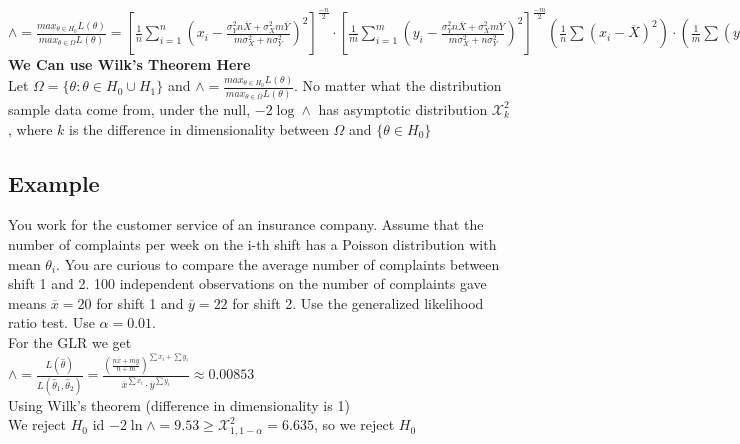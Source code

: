 \documentclass{article}
\begin{document}
\newline
$\wedge = \frac{max_{\theta\in H_0}L(\theta)}{max_{\theta\in\Omega}L(\theta)}=[\frac{1}{n}\sum_{i=1}^n(x_i-\frac{\sigma_Y^2n\overline{X}+\sigma_X^2m\overline{Y}}{m\sigma_X^2+n\sigma_Y^2})^2]^\frac{-n}{2}\cdot[\frac{1}{m}\sum_{i=1}^m(y_i-\frac{\sigma_Y^2n\overline{X}+\sigma_X^2m\overline{Y}}{m\sigma_X^2+n\sigma_Y^2})^2]^\frac{-m}{2}(\frac{1}{n}\sum(x_i-\overline{X})^2)\cdot(\frac{1}{m}\sum(y_i-\overline{Y})^2)exp[\frac{-n}{2}-\frac{m}{2}+\frac{n}{2}+\frac{m}{2}]$\\
\textbf{We Can use Wilk's Theorem Here}\\
Let $\Omega=\{\theta:\theta\in H_0\cup H_1\}$ and $\wedge=\frac{max_{\theta\in H_0}L(\theta)}{max_{\theta\in\Omega}L(\theta)}$. No matter what the distribution sample data come from, under the null, $-2\log\wedge$ has asymptotic distribution $\mathcal{X}^2_k$, where $k$ is the difference in dimensionality between $\Omega$ and $\{\theta\in H_0\}$
\subsection{Example}
You work for the customer service of an insurance company.
Assume that the number of complaints per week on the i-th shift has a Poisson
distribution with mean $\theta_i$. You are curious to compare the average number of complaints between shift 1 and 2. 100 independent observations on the number of
complaints gave means $\overline{x}=20$ for shift 1 and $\overline{y} = 22$ for shift 2. Use the generalized likelihood ratio test. Use $\alpha=0.01$.\\
For the GLR we get\\
$\wedge=\frac{L(\hat\theta)}{L(\hat\theta_1,\hat\theta_2)}=\frac{(\frac{n\overline{x}+m\overline{y}}{n+m})^{\sum x_i+\sum y_i}}{\overline{x}^{\sum x_i}\cdot\overline{y}^{\sum y_i}}\approx 0.00853$\\
Using Wilk's theorem (difference in dimensionality is 1)\\
We reject $H_0$ id $-2\ln\wedge=9.53\geq\mathcal{X}^2_{1,1-\alpha}=6.635$, so we reject $H_0$
\end{document}
